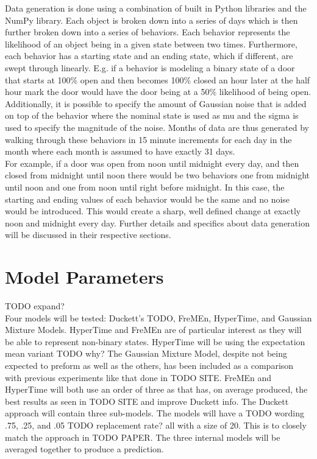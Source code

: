   Data generation is done using a combination of built in Python libraries and
  the NumPy library. Each object is broken down into a series of days which is
  then further broken down into a series of behaviors. Each behavior
  represents the likelihood of an object being in a given state between two
  times.  Furthermore, each behavior has a starting state and an ending state,
  which if different, are swept through linearly. E.g. if a behavior is
  modeling a binary state of a door that starts at 100\% open and then becomes
  100\% closed an hour later at the half hour mark the door would have the
  door being at a 50\% likelihood of being open. Additionally, it is possible
  to specify the amount of Gaussian noise that is added on top of the
  behavior where the nominal state is used as mu and the sigma is used to
  specify the magnitude of the noise. Months of data are thus generated by
  walking through these behaviors in 15 minute increments for each day in the
  month where each month is assumed to have exactly 31 days. \\

  For example, if a door was open from noon until midnight every day, and then closed from
  midnight until noon there would be two behaviors one from midnight until
  noon and one from noon until right before midnight. In this case, the
  starting and ending values of each behavior would be the same and no noise
  would be introduced. This would create a sharp, well defined change at
  exactly noon and midnight every day. Further details and specifics about data
  generation will be discussed in their respective sections. \\

  \section{ Model Parameters }
  TODO expand? \\

  Four models will be tested: Duckett's TODO, FreMEn, HyperTime, and Gaussian
  Mixture Models. HyperTime and FreMEn are of particular interest as they will
  be able to represent non-binary states. HyperTime will be using the
  expectation mean variant TODO why? The Gaussian Mixture Model, despite not
  being expected to preform as well as the others, has been included as a
  comparison with previous experiments like that done in TODO SITE. FreMEn and
  HyperTime will both use an order of three as that has, on average produced,
  the best results as seen in TODO SITE and improve Duckett info. The Duckett
  approach will contain three sub-models. The models will have a TODO wording
  .75, .25, and .05 TODO replacement rate? all with a size of 20. This is to
  closely match the approach in TODO PAPER. The three internal models will be
  averaged together to produce a prediction.\\

